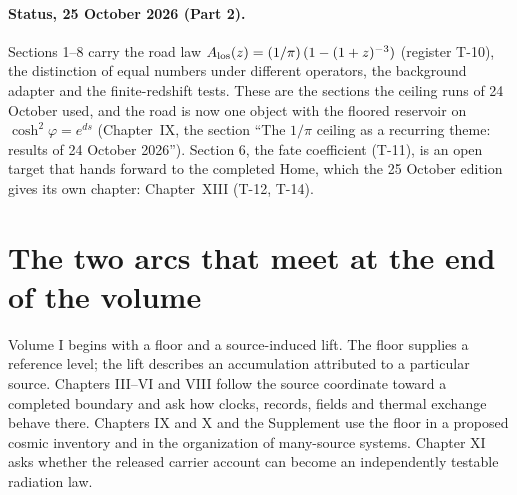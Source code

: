 \begin{abstract}
The closing chapter brings together two different structures: a line-of-sight accumulation law with saturation $1/\pi$, and a matter-inventory assignment with the same numerical value. Their equality is exact within the declared count rules, but a cosmological future requires a time-evolution law and a calibrated observable. We distinguish a distance-fit coefficient from the fractional expansion rate, derive the conditions under which the original $\Omega_\Lambda^{3/2}$ expression is meaningful, and formulate finite-redshift tests. The completed-boundary or Home continuation is then developed as an explicit conditional ledger, with conservation, radius-floor and information-channel requirements. A worked receipt sequence demonstrates growth while emitting, and a differential distance test exposes the assumptions hidden in a simple rate rescaling. The resulting closure program connects the thermal boundary, radiation response and cosmological inventory without treating their common numerical factors as a substitute for dynamics. No transition mechanism or future cosmological solution is claimed to have been established by count identities alone.
\end{abstract}

\paragraph*{Status, 25 October 2026 (Part 2).} Sections 1--8 carry the road law $A_{\rm los}(z)=(1/\pi)\,(1-(1+z)^{-3})$ (register T-10), the distinction of equal numbers under different operators, the background adapter and the finite-redshift tests. These are the sections the ceiling runs of 24 October used, and the road is now one object with the floored reservoir on $\cosh^2\varphi=e^{ds}$ (Chapter~IX, the section ``The $1/\pi$ ceiling as a recurring theme: results of 24 October 2026''). Section 6, the fate coefficient (T-11), is an open target that hands forward to the completed Home, which the 25 October edition gives its own chapter: Chapter~XIII (T-12, T-14).


\section{The two arcs that meet at the end of the volume}
Volume I begins with a floor and a source-induced lift. The floor supplies a reference level; the lift describes an accumulation attributed to a particular source. Chapters III--VI and VIII follow the source coordinate toward a completed boundary and ask how clocks, records, fields and thermal exchange behave there. Chapters IX and X and the Supplement use the floor in a proposed cosmic inventory and in the organization of many-source systems. Chapter XI asks whether the released carrier account can become an independently testable radiation law.

